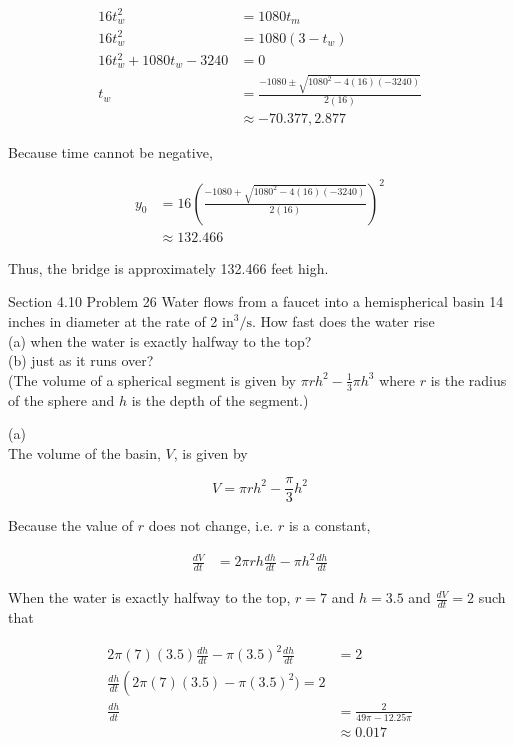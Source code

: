 \documentclass{article}
\begin{document}
    \begin{align*}
        16 t_w^2        &= 1080t_m \\
        16 t_w^2        &= 1080(3-t_w) \\
        16t_w^2 +1080t_w -3240 &= 0 \\
        t_w   &= \frac{-1080\pm\sqrt{1080^2-4(16)(-3240)}}{2(16)} \\
              &\approx -70.377, 2.877
    \end{align*}

    Because time cannot be negative,

    \begin{align*}
        y_0 &= 16\left(\frac{-1080+\sqrt{1080^2-4(16)(-3240)}}{2(16)}\right)^2 \\
            &\approx 132.466
    \end{align*}

    Thus, the bridge is approximately 132.466 feet high.


    \begin{tbhtheorem}{Section 4.10 Problem 26}
        Water flows from a faucet into a hemispherical basin 14 inches in diameter at the rate of 2 $\text{in}^3\text{/s}$. How fast does the water rise \\
        (a) when the water is exactly halfway to the top? \\
        (b) just as it runs over? \\

        (The volume of a spherical segment is given by $\pi rh^2 - \frac{1}{3}\pi h^3$ where $r$ is the radius of the sphere and $h$ is the depth of the segment.)
    \end{tbhtheorem}

    (a) \\
    The volume of the basin, $V$, is given by

    \[
        V = \pi rh^2 - \frac{\pi}{3} h^2
    \]

    Because the value of $r$ does not change, i.e. $r$ is a constant,

    \begin{align*}
        \frac{dV}{dt}   &= 2\pi r h \frac{dh}{dt} - \pi h^2 \frac{dh}{dt}
    \end{align*}

    When the water is exactly halfway to the top, $r = 7$ and $h=3.5$ and $\frac{dV}{dt}=2$ such that

    \begin{align*}
       2\pi (7)(3.5) \frac{dh}{dt} - \pi (3.5)^2 \frac{dh}{dt}  &= 2 \\
        \frac{dh}{dt} \left(2\pi (7)(3.5) - \pi (3.5)^2) = 2 \\
        \frac{dh}{dt}   &= \frac{2}{49\pi - 12.25\pi} \\
                        &\approx 0.017
    \end{align*}
\end{document}
